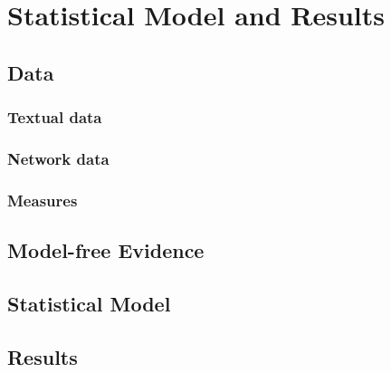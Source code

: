 \chapter{Statistical Model and Results\label{model}}

\section{Data}
\subsection{Textual data}
\subsection{Network data}
\subsection{Measures}
\section{Model-free Evidence}
\section{Statistical Model}
\section{Results}
